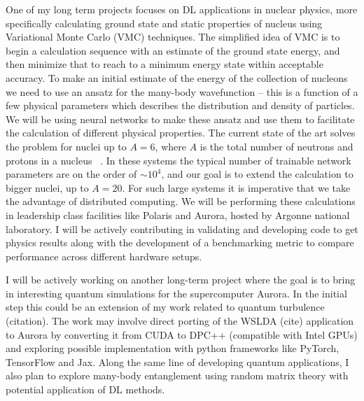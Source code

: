 \documentclass{article}
\begin{document}
One of my long term projects focuses on DL applications in nuclear physics, more
specifically calculating ground state and static properties of nucleus using
Variational Monte Carlo (VMC) techniques. The simplified idea of VMC is to 
begin a calculation sequence with an estimate of the ground state energy, and
then minimize that to reach to a minimum energy state within acceptable 
accuracy. To make an initial estimate of the energy of the collection of 
nucleons we need to use an ansatz for the many-body wavefunction -- this is a
function of a few physical parameters which describes the distribution and 
density of particles. We will be using neural networks to make these ansatz
and use them to facilitate the calculation of different physical properties. 
The current state of the art solves the problem for nuclei up to $A=6$, where 
$A$ is the total number of neutrons and protons in a nucleus
~\cite{Adams:2021, Gnech:2022}. In these systems the typical number of trainable
network parameters are on the order of $\sim 10^4$, and our goal is to extend
the calculation to bigger nuclei, up to $A=20$. For such large systems it is
imperative that we take the advantage of distributed computing. We will be 
performing these calculations in leadership class facilities like Polaris and
Aurora, hosted by Argonne national laboratory. I will be actively contributing 
in validating and developing code to get physics results along with the
development of a benchmarking metric to compare performance across different
hardware setups.

I will be actively working on another long-term project where the goal is to 
bring in interesting quantum simulations for the supercomputer Aurora. In the
initial step this could be an extension of my work related to quantum 
turbulence (citation). The work may involve direct porting of the WSLDA (cite)
application to Aurora by converting it from CUDA to DPC++ (compatible with 
Intel GPUs) and exploring possible implementation with python frameworks like
PyTorch, TensorFlow and Jax. Along the same line of developing quantum 
applications, I also plan to explore many-body entanglement using random matrix
theory with potential application of DL methods.



\end{document}
